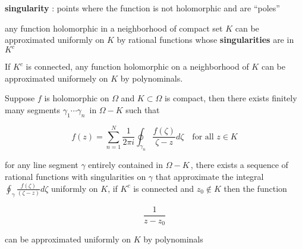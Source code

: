 \documentclass[11pt]{article}
\begin{document}
\textbf{singularity} : points where the function is not holomorphic and
are ``poles''

any function holomorphic in a neighborhood of compact set \(K\) can be
approximated uniformly on \(K\) by rational functions whose
\textbf{singularities} are in \(K^{c}\)

If \(K^{c}\) is connected, any function holomorphic on a neighborhood of
\(K\) can be approximated uniformely on \(K\) by polynominals.

Suppose \(f\) is holomorphic on \(\Omega\) and \(K\subset \Omega\) is
compact, then there exists finitely many segments
\(\gamma_{1}\cdots\gamma_{n}\,\) in \(\Omega-K\) such that

\[f(z)=\sum_{n=1}^{N}{\frac{1}{2\pi i}} \oint_{\gamma_{n}}{\frac{f(\zeta)}{\zeta-z}d\zeta}\quad\text{for all}\,\,z\in K\]

for any line segment \(\gamma\) entirely contained in \(\Omega-K\,\),
there exists a sequence of rational functions with singularities on
\(\gamma\) that approximate the integral
\(\oint_{\gamma}{\frac{f(\zeta)}{(\zeta-z)}d\zeta}\) uniformly on \(K\),
if \(K^{c}\) is connected and \(z_{0}\not\in K\) then the function

\[\dfrac{1}{z-z_{0}}\]

can be approximated uniformly on \(K\) by polynominals


    
    
    
\end{document}

